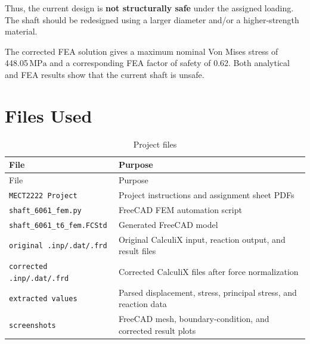 \documentclass[12pt,a4paper]{article}
\newcommand{\toprule}{\hline}
\newcommand{\midrule}{\hline}
\newcommand{\bottomrule}{\hline}
\newcommand{\SI}[2]{#1\,\ensuremath{\mathrm{#2}}}
\begin{document}
Thus, the current design is \textbf{not structurally safe} under the assigned loading. The shaft should be redesigned using a larger diameter and/or a higher-strength material.

The corrected FEA solution gives a maximum nominal Von Mises stress of \SI{448.05}{MPa} and a corresponding FEA factor of safety of 0.62. Both analytical and FEA results show that the current shaft is unsafe.

\appendix
\section{Files Used}

\begin{longtable}{p{}p{}}
\caption{Project files}\\
\toprule
File & Purpose \\
\midrule
\endfirsthead
\toprule
File & Purpose \\
\midrule
\endhead
\texttt{MECT2222 Project} & Project instructions and assignment sheet PDFs \\
\texttt{shaft\_6061\_fem.py} & FreeCAD FEM automation script \\
\texttt{shaft\_6061\_t6\_fem.FCStd} & Generated FreeCAD model \\
\texttt{original .inp/.dat/.frd} & Original CalculiX input, reaction output, and result files \\
\texttt{corrected .inp/.dat/.frd} & Corrected CalculiX files after force normalization \\
\texttt{extracted values} & Parsed displacement, stress, principal stress, and reaction data \\
\texttt{screenshots} & FreeCAD mesh, boundary-condition, and corrected result plots \\
\bottomrule
\end{longtable}
\end{document}
